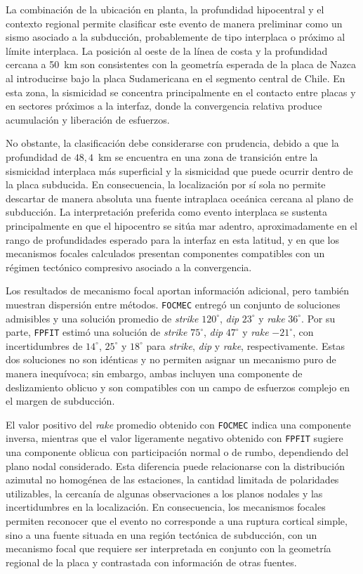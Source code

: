 \documentclass[a4paper,12pt]{article} %
\numberwithin{equation}{section} %
\numberwithin{figure}{section} %
\begin{document}
La combinación de la ubicación en planta, la profundidad hipocentral y el contexto regional permite clasificar este evento de manera preliminar como un sismo asociado a la subducción, probablemente de tipo interplaca o próximo al límite interplaca. La posición al oeste de la línea de costa y la profundidad cercana a 50~km son consistentes con la geometría esperada de la placa de Nazca al introducirse bajo la placa Sudamericana en el segmento central de Chile. En esta zona, la sismicidad se concentra principalmente en el contacto entre placas y en sectores próximos a la interfaz, donde la convergencia relativa produce acumulación y liberación de esfuerzos.

No obstante, la clasificación debe considerarse con prudencia, debido a que la profundidad de $48{,}4$~km se encuentra en una zona de transición entre la sismicidad interplaca más superficial y la sismicidad que puede ocurrir dentro de la placa subducida. En consecuencia, la localización por sí sola no permite descartar de manera absoluta una fuente intraplaca oceánica cercana al plano de subducción. La interpretación preferida como evento interplaca se sustenta principalmente en que el hipocentro se sitúa mar adentro, aproximadamente en el rango de profundidades esperado para la interfaz en esta latitud, y en que los mecanismos focales calculados presentan componentes compatibles con un régimen tectónico compresivo asociado a la convergencia.

Los resultados de mecanismo focal aportan información adicional, pero también muestran dispersión entre métodos. \texttt{FOCMEC} entregó un conjunto de soluciones admisibles y una solución promedio de \textit{strike} $120^\circ$, \textit{dip} $23^\circ$ y \textit{rake} $36^\circ$. Por su parte, \texttt{FPFIT} estimó una solución de \textit{strike} $75^\circ$, \textit{dip} $47^\circ$ y \textit{rake} $-21^\circ$, con incertidumbres de $14^\circ$, $25^\circ$ y $18^\circ$ para \textit{strike}, \textit{dip} y \textit{rake}, respectivamente. Estas dos soluciones no son idénticas y no permiten asignar un mecanismo puro de manera inequívoca; sin embargo, ambas incluyen una componente de deslizamiento oblicuo y son compatibles con un campo de esfuerzos complejo en el margen de subducción.

El valor positivo del \textit{rake} promedio obtenido con \texttt{FOCMEC} indica una componente inversa, mientras que el valor ligeramente negativo obtenido con \texttt{FPFIT} sugiere una componente oblicua con participación normal o de rumbo, dependiendo del plano nodal considerado. Esta diferencia puede relacionarse con la distribución azimutal no homogénea de las estaciones, la cantidad limitada de polaridades utilizables, la cercanía de algunas observaciones a los planos nodales y las incertidumbres en la localización. En consecuencia, los mecanismos focales permiten reconocer que el evento no corresponde a una ruptura cortical simple, sino a una fuente situada en una región tectónica de subducción, con un mecanismo focal que requiere ser interpretada en conjunto con la geometría regional de la placa y contrastada con información de otras fuentes.
\end{document}
